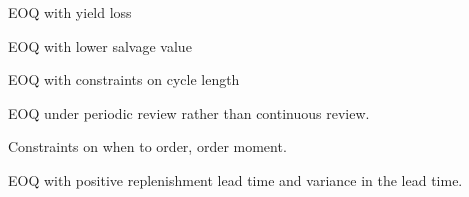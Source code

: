 \begin{exercise}
EOQ with yield loss

\end{exercise}

\begin{exercise}
EOQ with lower salvage value

\end{exercise}


\begin{exercise}
EOQ with constraints on cycle length

EOQ under periodic review rather than continuous review.

Constraints on when to order, order moment.

\end{exercise}


\begin{exercise}
  EOQ with positive replenishment lead time and variance in the lead
  time.

\end{exercise}

